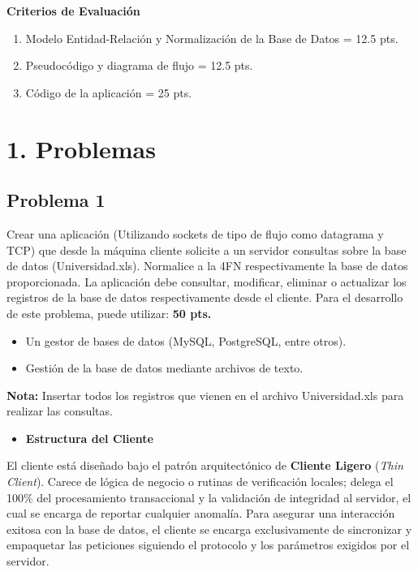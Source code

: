 \documentclass[12pt]{article}
\begin{document}
\begin{tcolorbox}
    \begin{center}
        \textbf{Criterios de Evaluación}
    \end{center}
    \begin{enumerate}
        \item Modelo Entidad-Relación y Normalización de la Base de Datos = 12.5 pts.
        \item Pseudocódigo y diagrama de flujo = 12.5 pts. 
        \item Código de la aplicación = 25 pts.
    \end{enumerate}
\end{tcolorbox}

\newpage %
\pagestyle{fancy}

\section{\large 1. Problemas}
\subsection{Problema 1}
Crear una aplicación (Utilizando sockets de tipo de flujo como datagrama y TCP) que desde la máquina cliente solicite a un servidor consultas sobre la base de datos (Universidad.xls). Normalice a la 4FN respectivamente la base de datos proporcionada. La aplicación debe consultar, modificar, eliminar o actualizar los registros de la base de datos respectivamente desde el cliente. Para el desarrollo de este problema, puede utilizar: \textbf{50 pts.}

\begin{itemize}
    \item Un gestor de bases de datos (MySQL, PostgreSQL, entre otros).
    \item Gestión de la base de datos mediante archivos de texto.
\end{itemize}

\textbf{Nota:} Insertar todos los registros que vienen en el archivo Universidad.xls para realizar las consultas.



\begin{itemize}
    \item \textbf{Estructura del Cliente}
\end{itemize}

El cliente está diseñado bajo el patrón arquitectónico de \textbf{Cliente Ligero} (\textit{Thin Client}). Carece de lógica de negocio o rutinas de verificación locales; delega el 100\% del procesamiento transaccional y la validación de integridad al servidor, el cual se encarga de reportar cualquier anomalía. Para asegurar una interacción exitosa con la base de datos, el cliente se encarga exclusivamente de sincronizar y empaquetar las peticiones siguiendo el protocolo y los parámetros exigidos por el servidor.
\end{document}
